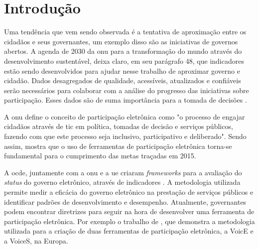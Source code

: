 \chapter[Introdução]{Introdução}
\label{cap:cap1}
\par
Uma tendência que vem sendo observada é a tentativa de aproximação entre os cidadãos e seus governantes, um exemplo disso são as iniciativas de governos abertos.
A agenda de 2030 da \acrfull{onu} para a transformação do mundo através do desenvolvimento sustentável, deixa claro, em seu parágrafo 48, que
indicadores estão sendo desenvolvidos para ajudar nesse trabalho de aproximar governo e cidadão. Dados desagregados de qualidade, acessíveis,
atualizados e confiáveis serão necessários para colaborar com a análise do progresso das iniciativas sobre participação. 
Esses dados são de suma importância para a tomada de decisões \cite{assembly2015transforming}.

\par
A \acrshort{onu} define o conceito de participação eletrônica como "o processo de engajar cidadãos através de \acrfull{tic} em política, tomadas de decisão e
serviços públicos, fazendo com que este processo seja inclusivo, participativo e deliberado". Sendo assim,  mostra
que o uso de ferramentas de participação eletrônica torna-se fundamental para o cumprimento das metas traçadas em 2015. 

\par
A \acrfull{ocde}, juntamente com a \acrshort{onu} e a \acrfull{ue} criaram \textit{frameworks} para a avaliação do \textit{status} do governo eletrônico,
através de indicadores \cite{onu2018}. A metodologia utilizada permite medir a eficácia do governo eletrônico na prestação de serviços públicos 
e identificar padrões de desenvolvimento e desempenho.
Atualmente, governantes podem encontrar diretrizes para seguir na hora de desenvolver uma ferramenta de participação eletrônica. 
Por exemplo o trabalho de , que demonstra a metodologia utilizada para a criação de duas ferramentas de participação eletrônica, a VoicE e a VoiceS, na Europa.


